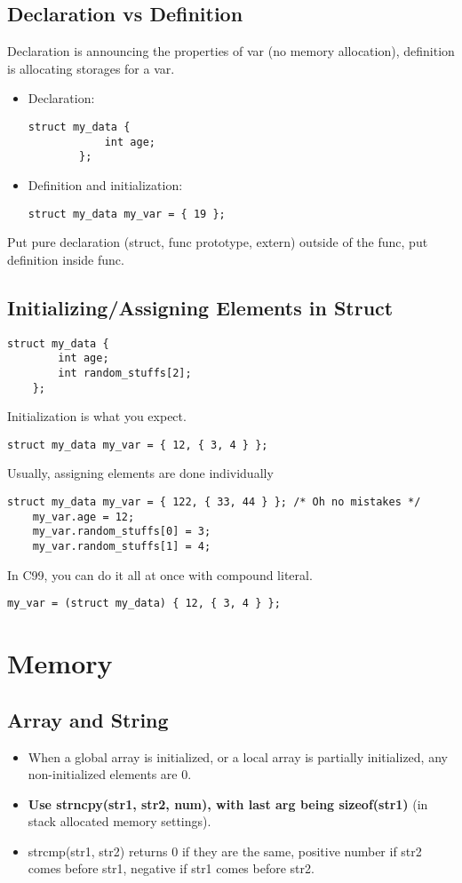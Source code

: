 \documentclass{article}
\begin{document}
\subsection{Declaration vs Definition}
Declaration is announcing the properties of var (no memory allocation), definition is allocating storages for a var.
\begin{itemize}
    \item Declaration:
    \begin{lstlisting}[style=CStyle]
        struct my_data {
            int age;
        };
    \end{lstlisting}
    \item Definition and initialization:
    \begin{lstlisting}[style=CStyle]
        struct my_data my_var = { 19 };
    \end{lstlisting}
\end{itemize}
Put pure declaration (struct, func prototype, extern) outside of the func, put definition inside func.

\subsection{Initializing/Assigning Elements in Struct}
\begin{lstlisting}[style=CStyle]
    struct my_data {
        int age;
        int random_stuffs[2];
    };
\end{lstlisting}
Initialization is what you expect.
\begin{lstlisting}[style=CStyle]
    struct my_data my_var = { 12, { 3, 4 } };
\end{lstlisting}
Usually, assigning elements are done individually
\begin{lstlisting}[style=CStyle]
    struct my_data my_var = { 122, { 33, 44 } }; /* Oh no mistakes */
    my_var.age = 12;
    my_var.random_stuffs[0] = 3;
    my_var.random_stuffs[1] = 4;
\end{lstlisting}
In C99, you can do it all at once with compound literal.
\begin{lstlisting}[style=CStyle]
    my_var = (struct my_data) { 12, { 3, 4 } };
\end{lstlisting}

\section{Memory}

\subsection{Array and String}
\begin{itemize}
    \item When a global array is initialized, or a local array is partially initialized, any non-initialized elements are 0.
    \item \textbf{Use strncpy(str1, str2, num), with last arg being sizeof(str1)} (in stack allocated memory settings).
    \item strcmp(str1, str2) returns 0 if they are the same, positive number if str2 comes before str1, negative if str1 comes before str2.
\end{itemize}
\end{document}
